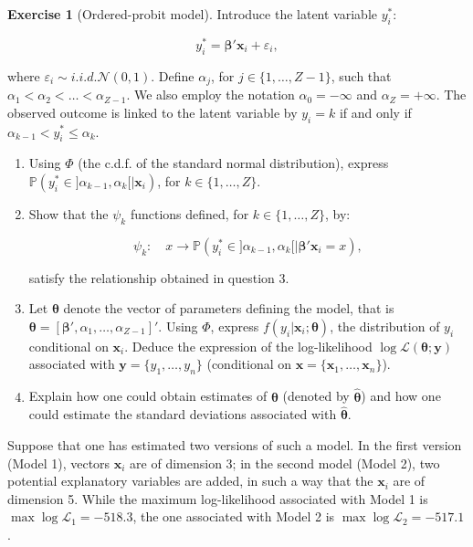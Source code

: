 \documentclass[
  11pt,
]{book}
\theoremstyle{definition}
\theoremstyle{definition}
\theoremstyle{definition}
\newtheorem{exercise}{Exercise}[chapter]
\theoremstyle{definition}
\theoremstyle{remark}
\begin{document}
\begin{exercisebox}
\begin{exercise}[Ordered-probit model]
Introduce the latent variable \(y_i^*\):

\[y_i^* = \boldsymbol{\beta}'\mathbf{x}_i + \varepsilon_i,\]

where \(\varepsilon_i \sim i.i.d. \mathcal{N}(0,1)\). Define \(\alpha_j\), for \(j \in \{1, \dots, Z-1\}\), such that \(\alpha_1 < \alpha_2 < \dots < \alpha_{Z-1}\). We also employ the notation \(\alpha_0 = -\infty\) and \(\alpha_Z = +\infty\). The observed outcome is linked to the latent variable by \(y_i=k\) if and only if \(\alpha_{k-1}<y_i^*\leq\alpha_k\).

\begin{enumerate}
\def\labelenumi{\arabic{enumi}.}
\setcounter{enumi}{3}
\item
  Using \(\Phi\) (the c.d.f. of the standard normal distribution), express \(\mathbb{P}(y_i^* \in ]\alpha_{k-1}, \alpha_k[ | \mathbf{x}_i)\), for \(k \in \{1, \dots, Z\}\).
\item
  Show that the \(\psi_k\) functions defined, for \(k \in \{1, \dots, Z\}\), by:

  \[\psi_k: \quad x \to \mathbb{P}(y_i^* \in ]\alpha_{k-1}, \alpha_k[ | \boldsymbol{\beta}' \mathbf{x}_i = x),\]

  satisfy the relationship obtained in question 3.
\item
  Let \(\boldsymbol{\theta}\) denote the vector of parameters defining the model, that is \(\boldsymbol{\theta} = [\boldsymbol{\beta}', \alpha_1, \dots, \alpha_{Z-1}]'\). Using \(\Phi\), express \(f(y_i | \mathbf{x}_i; \boldsymbol{\theta})\), the distribution of \(y_i\) conditional on \(\mathbf{x}_i\). Deduce the expression of the log-likelihood \(\log \mathcal{L}(\boldsymbol{\theta}; \mathbf{y})\) associated with \(\mathbf{y} = \{y_1, \dots, y_n\}\) (conditional on \(\mathbf{x} = \{\mathbf{x}_1, \dots, \mathbf{x}_n\}\)).
\item
  Explain how one could obtain estimates of \(\boldsymbol{\theta}\) (denoted by \(\hat{\boldsymbol{\theta}}\)) and how one could estimate the standard deviations associated with \(\hat{\boldsymbol{\theta}}\).
\end{enumerate}

Suppose that one has estimated two versions of such a model. In the first version (Model 1), vectors \(\mathbf{x}_i\) are of dimension 3; in the second model (Model 2), two potential explanatory variables are added, in such a way that the \(\mathbf{x}_i\) are of dimension 5. While the maximum log-likelihood associated with Model 1 is \(\max \log \mathcal{L}_1 = -518.3\), the one associated with Model 2 is \(\max \log \mathcal{L}_2 = -517.1\).


\end{exercise}
\end{exercisebox}
\end{document}
